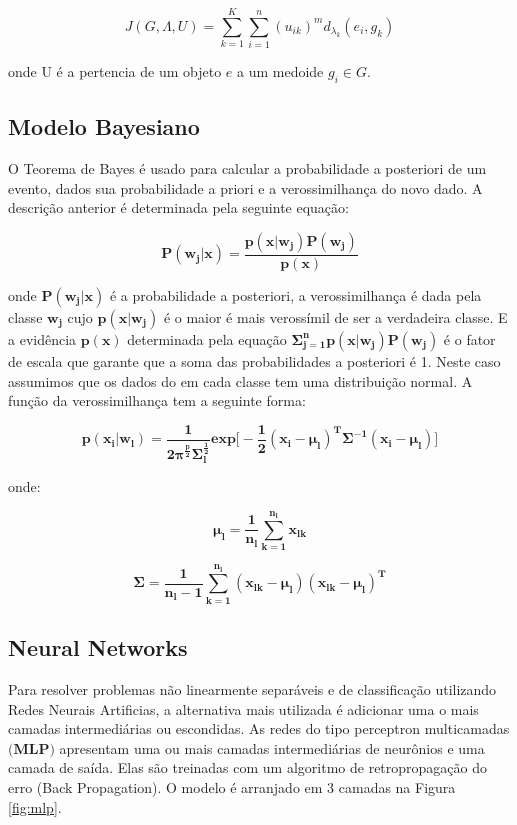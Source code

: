 \documentclass[12pt]{article}
\begin{document}
$$ J(G,\Lambda,U) = \sum_{k=1}^{K}\sum_{i=1}^{n} (u_{ik})^m d_{\lambda_{k}}(e_i,g_k) $$

onde U é a pertencia de um objeto $e$ a um medoide $ g_i \in G $.    

\subsection{Modelo Bayesiano}

O Teorema de Bayes é usado para calcular a probabilidade a posteriori de um evento, dados sua probabilidade a priori e a verossimilhança do novo dado. A descrição anterior é determinada pela seguinte equação:

\begin{equation}
\mathbf{P(w_j\vert x)= \dfrac{p(x\vert w_j) P(w_j)}{p(x)} }
\end{equation}

onde $\mathbf{P(w_j\vert x)}$ é a probabilidade a posteriori, a verossimilhança  é dada pela classe $\mathbf{w_j}$ cujo $\mathbf{p(x\vert w_j)}$ é o maior é mais verossímil de ser a verdadeira classe. E a evidência $\mathbf{p(x)}$ determinada pela equação $\mathbf{\Sigma_{j=1}^{n} p(x\vert w_j) P(w_j)}$ é o fator de escala que garante que a soma das probabilidades a posteriori é 1. Neste caso assumimos que os dados do em cada classe tem uma distribuição normal. A função da verossimilhança tem a seguinte forma: 

\begin{equation}
\mathbf{p(x_i\vert w_l)= \dfrac{1}{2\pi^\frac{p}{2}\Sigma_{l}^{\frac{1}{2}}}exp\Bigg[ -\frac{1}{2}(x_i- \mu_{l})^{T}\Sigma^{-1}(x_i-\mu_{l}) \Bigg ]  }
\end{equation}

onde:

\begin{equation}
\mathbf{\mu_{l} = \dfrac{1}{n_l} \sum_{k=1}^{n_l} x_{lk} }
\end{equation}

\begin{equation}
\mathbf{\Sigma = \dfrac{1}{n_l-1} \sum_{k=1}^{n_l} (x_{lk}-\mu_l) (x_{lk}-\mu_l)^T }
\end{equation}

\subsection{Neural Networks}

Para resolver problemas não linearmente separáveis e de classificação utilizando Redes Neurais Artificias, a alternativa mais utilizada é adicionar uma o mais camadas intermediárias ou escondidas. As redes do tipo perceptron multicamadas $\textbf{(MLP)}$ apresentam uma ou mais camadas intermediárias de neurônios e uma camada de saída. Elas são treinadas com um algoritmo de retropropagação do erro (Back Propagation).
O modelo é arranjado em 3 camadas na Figura \ref{fig:mlp}.
\end{document}

